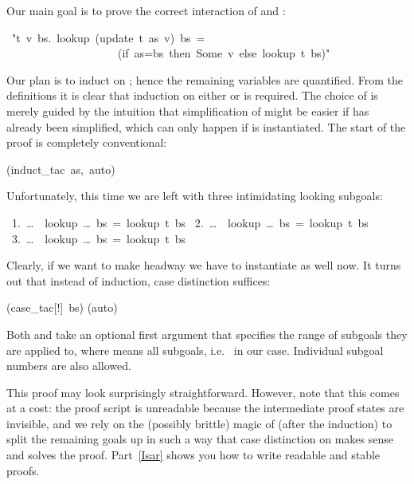 \begin{isabelle}
\begin{isamarkuptext}
Our main goal is to prove the correct interaction of  and
:%
\end{isamarkuptext}%
~{"}{\isasymforall}t~v~bs.~lookup~(update~t~as~v)~bs~=\isanewline
~~~~~~~~~~~~~~~~~~~~(if~as=bs~then~Some~v~else~lookup~t~bs){"}%
\begin{isamarkuptxt}%
\noindent
Our plan is to induct on ; hence the remaining variables are
quantified. From the definitions it is clear that induction on either
 or  is required. The choice of  is merely
guided by the intuition that simplification of  might be easier
if  has already been simplified, which can only happen if
 is instantiated.
The start of the proof is completely conventional:%
\end{isamarkuptxt}%
(induct\_tac~as,~auto)%
\begin{isamarkuptxt}%
\noindent
Unfortunately, this time we are left with three intimidating looking subgoals:
\begin{isabellepar}%
~1.~\dots~{\isasymLongrightarrow}~lookup~\dots~bs~=~lookup~t~bs\isanewline
~2.~\dots~{\isasymLongrightarrow}~lookup~\dots~bs~=~lookup~t~bs\isanewline
~3.~\dots~{\isasymLongrightarrow}~lookup~\dots~bs~=~lookup~t~bs%
\end{isabellepar}%
Clearly, if we want to make headway we have to instantiate  as
well now. It turns out that instead of induction, case distinction
suffices:%
\end{isamarkuptxt}%
(case\_tac[!]~bs)\isanewline
{}(auto)%
\begin{isamarkuptext}%
\noindent
Both  and 
take an optional first argument that specifies the range of subgoals they are
applied to, where \isa{!} means all subgoals, i.e.\ \isa{[1-3]} in our case. Individual
subgoal numbers are also allowed.

This proof may look surprisingly straightforward. However, note that this
comes at a cost: the proof script is unreadable because the
intermediate proof states are invisible, and we rely on the (possibly
brittle) magic of  (after the induction) to split the remaining
goals up in such a way that case distinction on  makes sense and
solves the proof. Part~\ref{Isar} shows you how to write readable and stable
proofs.%
\end{isamarkuptext}%
\end{isabelle}%
